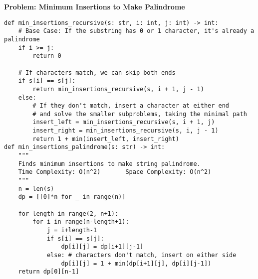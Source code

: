 \noindent\textbf{Problem: Minimum Insertions to Make Palindrome}
\begin{verbatim}
def min_insertions_recursive(s: str, i: int, j: int) -> int:
    # Base Case: If the substring has 0 or 1 character, it's already a palindrome
    if i >= j:
        return 0

    # If characters match, we can skip both ends
    if s[i] == s[j]:
        return min_insertions_recursive(s, i + 1, j - 1)
    else:
        # If they don't match, insert a character at either end
        # and solve the smaller subproblems, taking the minimal path
        insert_left = min_insertions_recursive(s, i + 1, j)
        insert_right = min_insertions_recursive(s, i, j - 1)
        return 1 + min(insert_left, insert_right)
def min_insertions_palindrome(s: str) -> int:
    """
    Finds minimum insertions to make string palindrome.
    Time Complexity: O(n^2)       Space Complexity: O(n^2)
    """
    n = len(s)
    dp = [[0]*n for _ in range(n)]
    
    for length in range(2, n+1):
        for i in range(n-length+1):
            j = i+length-1
            if s[i] == s[j]:
                dp[i][j] = dp[i+1][j-1]
            else: # characters don't match, insert on either side
                dp[i][j] = 1 + min(dp[i+1][j], dp[i][j-1])
    return dp[0][n-1]
\end{verbatim}

